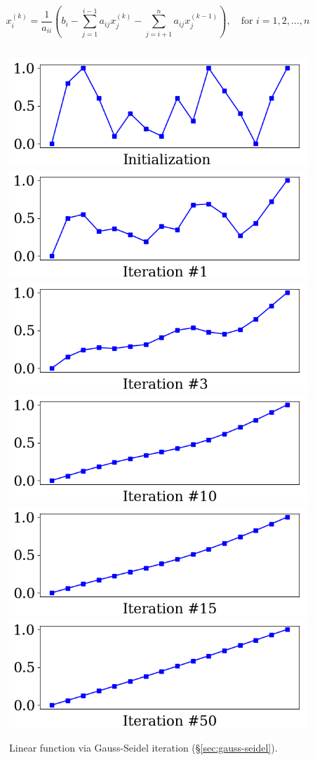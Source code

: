\documentclass[notitlepage]{report}
\begin{document}
$$
x_i^{(k)} = \frac{1}{a_{ii}} \left(b_i - \sum\limits_{j=1}^{i-1} a_{ij}x_j^{(k)} -  \sum\limits_{j=i+1}^n a_{ij}x_j^{(k-1)} \right), \quad \text{for } i=1,2,\dots,n
$$

\inputminted[frame=single,linenos=true]{python}{listings/example_3.2.py}


\begin{figure}[ht]
    \centering
    \includegraphics[width=.32\linewidth]{example_3.2_0.png}
    \includegraphics[width=.32\linewidth]{example_3.2_1.png}
    \includegraphics[width=.32\linewidth]{example_3.2_2.png}
    \includegraphics[width=.32\linewidth]{example_3.2_3.png}
    \includegraphics[width=.32\linewidth]{example_3.2_4.png}
    \includegraphics[width=.32\linewidth]{example_3.2_5.png}
    \caption{Linear function via Gauss-Seidel iteration (\S\ref{sec:gauss-seidel}).}
    \label{fig:linsys_smooth_constrain}
\end{figure}
\end{document}
